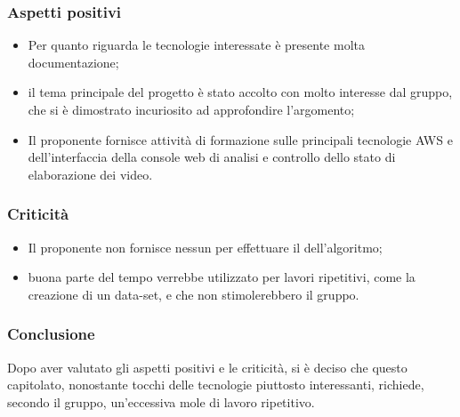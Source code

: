     \subsubsection{Aspetti positivi}
    \begin{itemize}
    		\item Per quanto riguarda le tecnologie interessate è presente molta documentazione;
    		\item il tema principale del progetto è stato accolto con molto interesse dal gruppo, che si è dimostrato incuriosito ad approfondire l'argomento;
    		 \item Il proponente fornisce attività di formazione sulle principali tecnologie AWS e  dell'interfaccia della console web di analisi e controllo dello stato di elaborazione dei video.
    \end{itemize}
    \subsubsection{Criticità}
    \begin{itemize}
    		\item Il proponente non fornisce nessun  per effettuare il  dell'algoritmo;
    		\item buona parte del tempo verrebbe utilizzato per lavori ripetitivi, come la creazione di un data-set, e che non stimolerebbero il gruppo.
    \end{itemize}

    \subsubsection{Conclusione}
	Dopo aver valutato gli aspetti positivi e le criticità, si è deciso che questo capitolato, nonostante tocchi delle tecnologie piuttosto interessanti, richiede, secondo il gruppo, un'eccessiva mole di lavoro ripetitivo.
